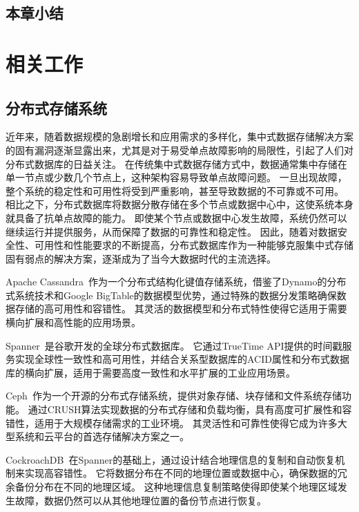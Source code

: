 \section{本章小结}

\chapter{相关工作}
\section{分布式存储系统}
近年来，随着数据规模的急剧增长和应用需求的多样化，集中式数据存储解决方案的固有漏洞逐渐显露出来，尤其是对于易受单点故障影响的局限性，引起了人们对分布式数据库的日益关注。
在传统集中式数据存储方式中，数据通常集中存储在单一节点或少数几个节点上，这种架构容易导致单点故障问题。
一旦出现故障，整个系统的稳定性和可用性将受到严重影响，甚至导致数据的不可靠或不可用。
相比之下，分布式数据库将数据分散存储在多个节点或数据中心中，这使系统本身就具备了抗单点故障的能力。
即使某个节点或数据中心发生故障，系统仍然可以继续运行并提供服务，从而保障了数据的可靠性和稳定性。
因此，随着对数据安全性、可用性和性能要求的不断提高，分布式数据库作为一种能够克服集中式存储固有弱点的解决方案，逐渐成为了当今大数据时代的主流选择。

Apache Cassandra~\cite{lakshman2010cassandra}作为一个分布式结构化键值存储系统，借鉴了Dynamo的分布式系统技术和Google BigTable的数据模型优势，通过特殊的数据分发策略确保数据存储的高可用性和容错性。
其灵活的数据模型和分布式特性使得它适用于需要横向扩展和高性能的应用场景。

Spanner~\cite{corbett2013spanner}是谷歌开发的全球分布式数据库。
它通过TrueTime API提供的时间戳服务实现全球性一致性和高可用性，并结合关系型数据库的ACID属性和分布式数据库的横向扩展，适用于需要高度一致性和水平扩展的工业应用场景。

Ceph~\cite{weil2006ceph}作为一个开源的分布式存储系统，提供对象存储、块存储和文件系统存储功能。
通过CRUSH算法实现数据的分布式存储和负载均衡，具有高度可扩展性和容错性，适用于大规模存储需求的工业环境。
其灵活性和可靠性使得它成为许多大型系统和云平台的首选存储解决方案之一。

CockroachDB~\cite{taft2020cockroachdb}在Spanner的基础上，通过设计结合地理信息的复制和自动恢复机制来实现高容错性。
它将数据分布在不同的地理位置或数据中心，确保数据的冗余备份分布在不同的地理区域。
这种地理信息复制策略使得即使某个地理区域发生故障，数据仍然可以从其他地理位置的备份节点进行恢复。

